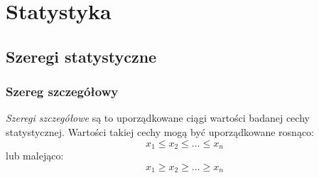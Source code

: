 \documentclass[../Matematyka.tex]{subfiles}
\begin{document}
\section{Statystyka}

\subsection{Szeregi statystyczne}
\subsubsection*{Szereg szczegółowy}
\textit{Szeregi szczegółowe} są to uporządkowane ciągi wartości badanej cechy statystycznej.
Wartości takiej cechy mogą być uporządkowane rosnąco:
\[x_1 \leq x_2 \leq \ldots \leq x_n\]
lub malejąco:
\[x_1 \geq x_2 \geq \ldots \geq x_n\]
\end{document}
